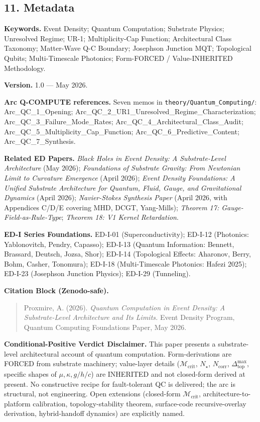 \documentclass[
  11pt,
  a4paper,
]{article}
\begin{document}
\subsection{11. Metadata}\label{metadata}

\textbf{Keywords.} Event Density; Quantum Computation; Substrate
Physics; Unresolved Regime; UR-1; Multiplicity-Cap Function;
Architectural Class Taxonomy; Matter-Wave Q-C Boundary; Josephson
Junction MQT; Topological Qubits; Multi-Timescale Photonics; Form-FORCED
/ Value-INHERITED Methodology.

\textbf{Version.} 1.0 --- May 2026.

\textbf{Arc Q-COMPUTE references.} Seven memos in
\texttt{theory/Quantum\_Computing/}: Arc\_QC\_1\_Opening;
Arc\_QC\_2\_UR1\_Unresolved\_Regime\_Characterization;
Arc\_QC\_3\_Failure\_Mode\_Rates;
Arc\_QC\_4\_Architectural\_Class\_Audit;
Arc\_QC\_5\_Multiplicity\_Cap\_Function;
Arc\_QC\_6\_Predictive\_Content; Arc\_QC\_7\_Synthesis.

\textbf{Related ED Papers.} \emph{Black Holes in Event Density: A
Substrate-Level Architecture} (May 2026); \emph{Foundations of Substrate
Gravity: From Newtonian Limit to Curvature Emergence} (April 2026);
\emph{Event Density Foundations: A Unified Substrate Architecture for
Quantum, Fluid, Gauge, and Gravitational Dynamics} (April 2026);
\emph{Navier-Stokes Synthesis Paper} (April 2026, with Appendices C/D/E
covering MHD, DCGT, Yang-Mills); \emph{Theorem 17:
Gauge-Field-as-Rule-Type}; \emph{Theorem 18: V1 Kernel Retardation}.

\textbf{ED-I Series Foundations.} ED-I-01 (Superconductivity); ED-I-12
(Photonics: Yablonovitch, Pendry, Capasso); ED-I-13 (Quantum
Information: Bennett, Brassard, Deutsch, Jozsa, Shor); ED-I-14
(Topological Effects: Aharonov, Berry, Bohm, Casher, Tonomura); ED-I-18
(Multi-Timescale Photonics: Hafezi 2025); ED-I-23 (Josephson Junction
Physics); ED-I-29 (Tunneling).

\textbf{Citation Block (Zenodo-safe).}

\begin{quote}
Proxmire, A. (2026). \emph{Quantum Computation in Event Density: A
Substrate-Level Architecture and Its Limits.} Event Density Program,
Quantum Computing Foundations Paper, May 2026.
\end{quote}

\textbf{Conditional-Positive Verdict Disclaimer.} This paper presents a
substrate-level architectural account of quantum computation.
Form-derivations are FORCED from substrate machinery; value-layer
details (\(\mathcal{M}_{\mathrm{crit}}\), \(N_\star\),
\(N_{\mathrm{corr}}\), \(\Delta_{\mathrm{top}}^{\max}\), specific shapes
of \(\mu, \kappa, g/h/c\)) are INHERITED and not closed-form derived at
present. No constructive recipe for fault-tolerant QC is delivered; the
arc is structural, not engineering. Open extensions (closed-form
\(\mathcal{M}_{\mathrm{crit}}\), architecture-to-platform calibration,
topology-stability theorem, surface-code recursive-overlay derivation,
hybrid-handoff dynamics) are explicitly named.
\end{document}
